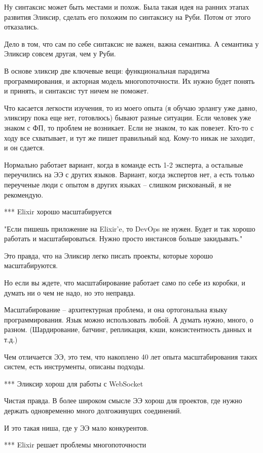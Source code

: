 \documentclass[10pt]{beamer}
\begin{document}
Ну синтаксис может быть местами и похож. Была такая идея на ранних этапах развития Эликсир, сделать его похожим по синтаксису на Руби. Потом от этого отказались.

Дело в том, что сам по себе синтаксис не важен, важна семантика. А семантика у Эликсир совсем другая, чем у Руби.

В основе эликсир две ключевые вещи: функциональная парадигма программирования, и акторная модель многопоточности.
Их нужно будет понять и принять, и синтаксис тут ничем не поможет.

Что касается легкости изучения, то из моего опыта (я обучаю эрлангу уже давно, эликсиру пока еще нет, готовлюсь) бывают разные ситуации.
Если человек уже знаком с ФП, то проблем не возникает.
Если не знаком, то как повезет. Кто-то с ходу все схватывает, и тут же пишет правильный код. Кому-то никак не заходит, и он сдается.

Нормально работает вариант, когда в команде есть 1-2 эксперта, а остальные переучились на ЭЭ с других языков.
Вариант, когда экспертов нет, а есть только переученые люди с опытом в других языках -- слишком рискованый, я не рекомендую.


*** Elixir хорошо масштабируется

"Если пишешь приложение на Elixir'e, то DevOps не нужен. Будет и так хорошо работать и масштабироваться. Нужно просто инстансов больше закидывать."

Это правда, что на Эликсир легко писать проекты, которые хорошо масштабируются.

Но если вы ждете, что масштабирование работает само по себе из коробки, и думать ни о чем не надо, но это неправда.

Масштабирование -- архитектурная проблема, и она ортогональна языку программирования. Язык можно использовать любой. А думать нужно, много, о разном.
(Шардирование, батчинг, репликация, кэши, консистентность данных и т.д.)

Чем отличается ЭЭ, это тем, что накоплено 40 лет опыта масштабирования таких систем, есть инструменты, описаны подходы.


*** Эликсир хорош для работы с WebSocket

Чистая правда. В более широком смысле ЭЭ хорош для проектов, где нужно держать одновременно много долгоживущих соединений.

И это такая ниша, где у ЭЭ мало конкурентов.


*** Elixir решает проблемы многопоточности
\end{document}
